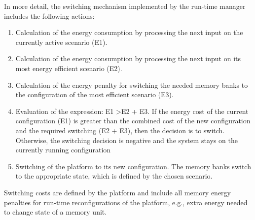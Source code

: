 In more detail, the switching mechanism implemented by the run-time manager includes the following actions: 
\begin{enumerate}
\item Calculation of the energy consumption by processing the next input on the currently active scenario (E1).
\item Calculation of the energy consumption by processing the next input on its most energy efficient scenario (E2).
\item Calculation of the energy penalty for switching the needed memory banks to the configuration of the most efficient scenario (E3).
\item Evaluation of the expression: E1 \textgreater  E2 + E3. If the energy cost of the current configuration (E1) is greater than the combined cost of the new configuration and the required switching (E2 + E3), then the decision is to switch. Otherwise, the switching decision is negative and the system stays on the currently running configuration
\item Switching of the platform to its new configuration. The memory banks switch to the appropriate state, which is defined by the chosen scenario. 
\end{enumerate}
Switching costs are defined by the platform and include all memory energy penalties for run-time reconfigurations of the platform, e.g., extra energy needed to change state of a memory unit.

